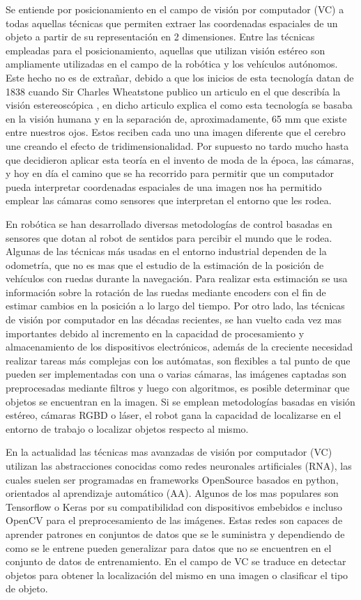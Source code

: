 Se entiende por posicionamiento en el campo de visión por computador (VC) a todas aquellas técnicas que permiten extraer las coordenadas espaciales de un objeto a partir de su representación en 2 dimensiones. Entre las técnicas empleadas para el posicionamiento, aquellas que utilizan visión estéreo son ampliamente utilizadas en el campo de la robótica y los vehículos autónomos. Este hecho no es de extrañar, debido a que los inicios de esta tecnología datan de 1838 cuando Sir Charles Wheatstone publico un articulo en el que describía la visión estereoscópica \cite{Wheatstone1837}, en dicho articulo explica el como esta tecnología se basaba en la visión humana y en la separación de, aproximadamente, 65 mm que existe entre nuestros ojos. Estos reciben cada uno una imagen diferente que el cerebro une creando el efecto de tridimensionalidad. Por supuesto no tardo mucho hasta que decidieron aplicar esta teoría en el invento de moda de la época, las cámaras, y hoy en día el camino que se ha recorrido para permitir que un computador pueda interpretar coordenadas espaciales de una imagen nos ha permitido emplear las cámaras como sensores que interpretan el entorno que les rodea. 

En robótica se han desarrollado diversas metodologías de control basadas en sensores que dotan al robot de sentidos para percibir el mundo que le rodea. Algunas de las técnicas más usadas en el entorno industrial dependen de la odometría, que no es mas que el estudio de  la estimación de la posición de vehículos con ruedas durante la navegación. Para realizar esta estimación se usa información sobre la rotación de las ruedas mediante encoders con el fin de estimar cambios en la posición a lo largo del tiempo. Por otro lado, las técnicas de visión por computador en las décadas recientes, se han vuelto cada vez mas importantes debido al incremento en la capacidad de procesamiento y almacenamiento de los dispositivos electrónicos, además de la creciente necesidad realizar tareas más complejas con los autómatas, son flexibles a tal punto de que pueden ser implementadas con una o varias cámaras, las imágenes captadas son preprocesadas mediante filtros y luego con algoritmos, es posible determinar que objetos se encuentran en la imagen. Si se emplean metodologías basadas en visión estéreo, cámaras RGBD o láser, el robot gana la capacidad de localizarse en el entorno de trabajo o localizar objetos respecto al mismo.

En la actualidad las técnicas mas avanzadas de visión por computador (VC) utilizan las abstracciones conocidas como redes neuronales artificiales (RNA), las cuales suelen ser programadas en frameworks OpenSource basados en python, orientados al aprendizaje automático (AA). Algunos de los mas populares son Tensorflow o Keras por su compatibilidad con dispositivos embebidos  e incluso OpenCV para el preprocesamiento de las imágenes. Estas redes son capaces de aprender patrones en conjuntos de datos que se le suministra y dependiendo de como se le entrene pueden generalizar para datos que no se encuentren en el conjunto de datos de entrenamiento. En el campo de VC se traduce en detectar objetos para obtener la localización del mismo en una imagen o clasificar el tipo de objeto.


